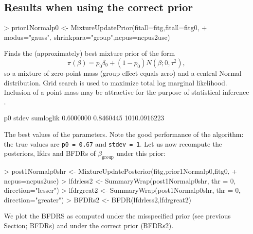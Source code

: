 \documentclass[11pt]{article}
\begin{document}
\subsection{Results when using the correct prior}\label{correct}

%
\begin{Schunk}
\begin{Sinput}
> prior1Normalp0 <- MixtureUpdatePrior(fitall=fitg,fitall=fitg0,
+ modus="gauss", shrinkpara="group",ncpus=ncpus2use)
\end{Sinput}
\end{Schunk}
Finds the (approximately) best mixture prior of the form
\begin{equation}\label{gaussdirac}
\pi(\beta) = p_0 \delta_0 + (1-p_0) N(\beta; 0,\tau^2),
\end{equation} so a mixture of
zero-point mass (group effect equals zero) and a central Normal distribution. Grid search is used to maximize total
log marginal likelihood. Inclusion of a point mass may be attractive for the purpose of statistical inference
\citep{WielShrinkSeq}.

\begin{Schunk}
\begin{Soutput}
          p0        stdev    sumloglik
   0.6000000    0.8460445 1010.0916223
\end{Soutput}
\end{Schunk}
The best values of the parameters. Note the good performance of the algorithm:
the true values are {\tt p0 = 0.67} and {\tt stdev = 1}.
Let us now recompute the posteriors, lfdrs and BFDRs
of $\beta_{}$ under this prior:

\begin{Schunk}
\begin{Sinput}
> post1Normalp0shr <- MixtureUpdatePosterior(fitg,prior1Normalp0,fitg0,
+ ncpus=ncpus2use)
> lfdrless2 <- SummaryWrap(post1Normalp0shr, thr = 0, direction="lesser")
> lfdrgreat2 <- SummaryWrap(post1Normalp0shr, thr = 0, direction="greater")
> BFDRs2 <- BFDR(lfdrless2,lfdrgreat2)
\end{Sinput}
\end{Schunk}

We plot the BFDRS as computed under the misspecified prior (see previous Section; BFDRs) and under the correct prior (BFDRs2).
\end{document}
